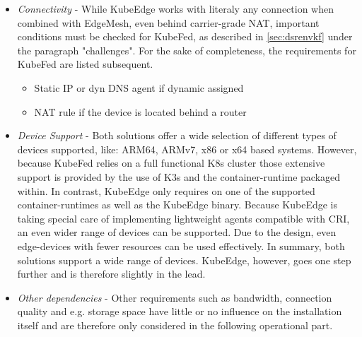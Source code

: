 \documentclass[MIC,Master,english]{twbook}%
\begin{document}
\begin{itemize}
    \item \textit{Connectivity} - While KubeEdge works with literaly any connection when combined with EdgeMesh, even behind carrier-grade \ac{NAT}\cite{cg-nat}, important conditions must be checked for KubeFed, as described in \autoref{sec:dsrenvkf} under the paragraph "challenges". For the sake of completeness, the requirements for KubeFed are listed subsequent.
    \begin{itemize}
        \item Static \ac{IP} or dyn \ac{DNS} agent if dynamic assigned
        \item \ac{NAT} rule if the device is located behind a router
    \end{itemize}
    \item \textit{Device Support} - Both solutions offer a wide selection of different types of devices supported, like: ARM64, ARMv7, x86 or x64 based systems. However, because \ac{KubeFed} relies on a full functional \ac{K8s} cluster those extensive support is provided by the use of K3s and the container-runtime packaged within. In contrast, KubeEdge only requires on one of the supported container-runtimes as well as the KubeEdge binary. Because KubeEdge is taking special care of implementing lightweight agents compatible with \ac{CRI}\cite{k8scri,ke-cri-gh}, an even wider range of devices can be supported. Due to the design, even edge-devices with fewer resources can be used effectively. In summary, both solutions support a wide range of devices. KubeEdge, however, goes one step further and is therefore slightly in the lead.
    \item \textit{Other dependencies} - Other requirements such as bandwidth, connection quality and e.g. storage space have little or no influence on the installation itself and are therefore only considered in the following operational part.
\end{itemize}
\end{document}
